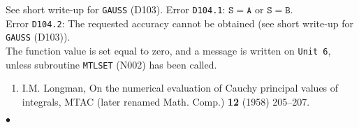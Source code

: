 \Accuracy
See short write-up for {\tt GAUSS} (D103).
\Errorh
Error {\tt D104.1}: $\mathtt{S=A}$ or $\mathtt{S=B}$. \\
Error {\tt D104.2}: The requested accuracy cannot be obtained
(see short write-up for {\tt GAUSS} (D103)). \\
The function value is set equal to zero, and a message is written on
{\tt Unit 6}, unless subroutine {\tt MTLSET} (N002) has been called.
\Refer
\begin{enumerate}
\item I.M. Longman, On the numerical evaluation of Cauchy principal
values of integrals, MTAC (later renamed Math. Comp.)
{\bf 12} (1958) 205--207.
\end{enumerate}
$\bullet$

